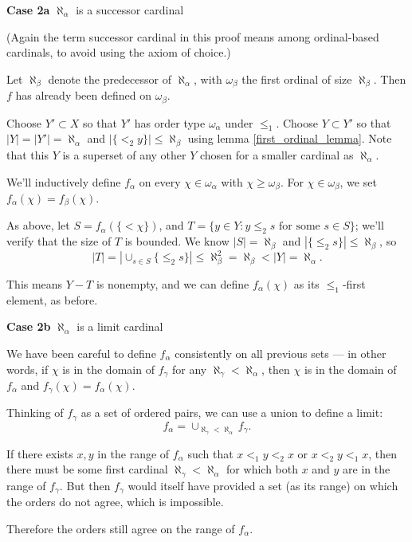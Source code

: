 \documentclass[11pt]{amsart}
\begin{document}
{\bf Case 2a} $\aleph_\alpha$ is a successor cardinal

(Again the term successor cardinal in this proof means among
ordinal-based cardinals, to avoid using the axiom of choice.)

Let $\aleph_\beta$ denote the predecessor of $\aleph_\alpha$,
with $\omega_\beta$ the first ordinal of size $\aleph_\beta$.
Then $f$ has already been defined on $\omega_\beta$.

Choose $Y' \subset X$ so that $Y'$ has order type $\omega_\alpha$
under $\le_1$. Choose $Y\subset Y'$ so that $|Y| = |Y'| = \aleph_\alpha$
and $| \{ <_2 y \} | \le \aleph_\beta$ using lemma \ref{first_ordinal_lemma}.
Note that this $Y$ is a superset of any other $Y$ chosen for a smaller cardinal
as $\aleph_\alpha$.

We'll inductively define $f_\alpha$ on every $\chi \in \omega_\alpha$ with $\chi \ge \omega_\beta$.
For $\chi \in \omega_\beta$, we set $f_\alpha(\chi) = f_\beta(\chi)$.

As above, let $S = f_\alpha( \{ < \chi \} )$,
and $ T = \{ y \in Y : y \le_2 s \text{ for some } s \in S \}$; we'll verify that the size of $T$ is bounded.
We know $|S| = \aleph_\beta$ and $|\{ \le_2 s \} | \le \aleph_\beta$, so
$$ |T| = \left|\cup_{s\in S} \{ \le_2 s \}\right| \le \aleph_\beta^2 = \aleph_\beta < |Y| = \aleph_\alpha. $$

This means $Y-T$ is nonempty, and we can define $f_\alpha(\chi)$ as its $\le_1$-first element, as before.

{\bf Case 2b} $\aleph_\alpha$ is a limit cardinal

We have been careful to define $f_\alpha$ consistently on all previous sets ---
in other words, if $\chi$ is in the domain of $f_\gamma$ for any $\aleph_\gamma < \aleph_\alpha$,
then $\chi$ is in the domain of $f_\alpha$ and $f_\gamma(\chi) = f_\alpha(\chi)$.

Thinking of $f_\gamma$ as a set of ordered pairs,
we can use a union to define a limit:
$$ f_\alpha = \cup_{\aleph_\gamma < \aleph_\alpha} f_\gamma. $$

If there exists $x, y$ in the range of $f_\alpha$ such that $x <_1 y <_2 x$ or $x <_2 y <_1 x$, then
there must be some first cardinal $\aleph_\gamma < \aleph_\alpha$ for which both $x$ and $y$ are in the
range of $f_\gamma$. But then $f_\gamma$ would itself have provided a set (as its range)
on which the orders do not agree, which is impossible.

Therefore the orders still agree on the range of $f_\alpha$.
\end{document}
